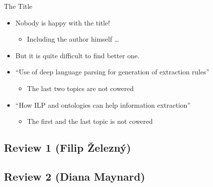 \documentclass[xcolor=dvipsnames]{beamer}
\begin{document}
\begin{frame}{The Title}
\begin{itemize}
	\item Nobody is happy with the title!
	\begin{itemize}
		\item Including the author himself \dots
	\end{itemize}
	\bigskip
	\item But it is quite difficult to find better one.
	\bigskip
	\item ``Use of deep language parsing for generation of extraction rules''
	\begin{itemize}
		\item The last two topics are not cowered
	\end{itemize}
	\item ``How ILP and ontologies can help information extraction''
	\begin{itemize}
		\item The first and the last topic is not cowered
	\end{itemize}
\end{itemize}
\end{frame}



\subsection{Review 1 (Filip Železný)} 

\subsection{Review 2 (Diana Maynard)} 
\end{document}
